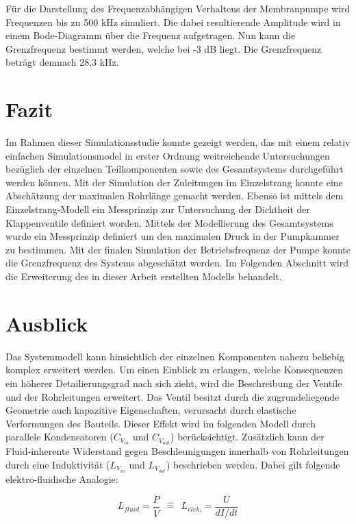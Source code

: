 \documentclass[fontsize=12pt, a4paper]{scrartcl}
\begin{document}
Für die Darstellung des Frequenzabhängigen Verhaltens der Membranpumpe wird Frequenzen bis zu 500 kHz simuliert. Die dabei resultierende Amplitude wird in einem Bode-Diagramm über die Frequenz aufgetragen. Nun kann die Grenzfrequenz bestimmt werden, welche bei -3 dB liegt. Die Grenzfrequenz beträgt demnach 28,3 kHz.

\section{Fazit}

Im Rahmen dieser Simulationsstudie konnte gezeigt werden, das mit einem relativ einfachen Simulationsmodel in erster Ordnung weitreichende Untersuchungen bezüglich der einzelnen Teilkomponenten sowie des Gesamtsystems durchgeführt werden können. Mit der Simulation der Zuleitungen im Einzelstrang konnte eine Abschätzung der maximalen Rohrlänge gemacht werden. Ebenso ist mittels dem Einzelstrang-Modell ein Messprinzip zur Untersuchung der Dichtheit der Klappenventile definiert worden. Mittels der Modellierung des Gesamtsystems wurde ein Messprinzip definiert um den maximalen Druck in der Pumpkammer zu bestimmen. Mit der finalen Simulation der Betriebsfrequenz der Pumpe konnte die Grenzfrequenz des Systems abgeschätzt werden. Im Folgenden Abschnitt wird die Erweiterung des in dieser Arbeit erstellten Modells behandelt.

\section{Ausblick}

Das Systemmodell kann hinsichtlich der einzelnen Komponenten nahezu beliebig komplex erweitert werden. Um einen Einblick zu erlangen, welche Konsequenzen ein höherer Detailierungsgrad nach sich zieht, wird die Beschreibung der Ventile und der Rohrleitungen erweitert. Das Ventil besitzt durch die zugrundeliegende Geometrie auch kapazitive Eigenschaften, verursacht durch elastische Verformungen des Bauteils. Dieser Effekt wird im folgenden Modell durch parallele Kondensatoren ($C_{V_{in}}$ und $C_{V_{out}}$) berücksichtigt. Zusätzlich kann der Fluid-inherente Widerstand gegen Beschleunigungen innerhalb von Rohrleitungen durch eine Induktivität ($L_{V_{in}}$ und $L_{V_{out}}$) beschrieben werden. Dabei gilt folgende elektro-fluidische Analogie:


\begin{equation}
	L_{fluid} = \frac{P}{\ddot{V}} \:\:\widehat{=}\:\: L_{elek.} = \frac{U}{dI/dt}
\end{equation}
\end{document}
